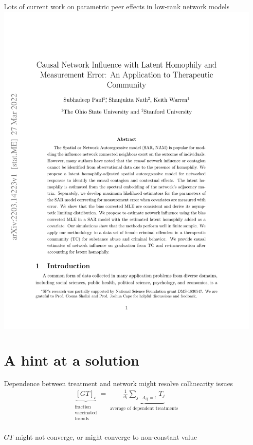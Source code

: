\documentclass[aspectratio=169]{beamer}
\theoremstyle{remark}
\begin{document}
\begin{frame}{Lots of current work on parametric peer effects in low-rank network models}
    \centering
    \includegraphics[height=0.95\textheight, page=1, trim={1.5cm 6cm 0 4cm}, clip]{./papers/paul.pdf}
\end{frame}


\section{A hint at a solution}

\begin{frame}{Dependence between treatment and network might resolve collinearity issues}
    \Large
    \begin{align*}
        \underbrace{[GT]_i}_{\substack{\text{fraction} \\ \text{vaccinated} \\ \text{friends}}}
        = \underbrace{
            \frac{1}{d_i} \sum_{j \, : \, A_{ij} = 1} T_j
        }_{\substack{\text{average of dependent treatments}}}
    \end{align*} \\
    \normalsize
    \centering
    \vspace{8mm}
    $GT$ might not converge, or might converge to non-constant value
\end{frame}
\end{document}
